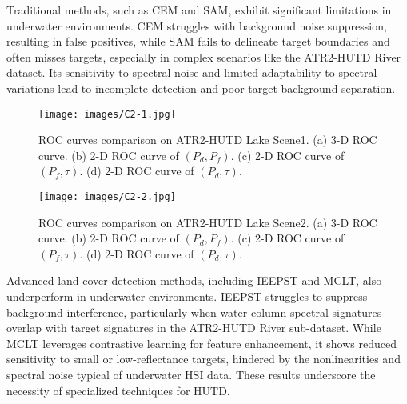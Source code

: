 Traditional methods, such as CEM and SAM, exhibit significant limitations in underwater environments. CEM struggles with background noise suppression, resulting in false positives, while SAM fails to delineate target boundaries and often misses targets, especially in complex scenarios like the ATR2-HUTD River dataset. Its sensitivity to spectral noise and limited adaptability to spectral variations lead to incomplete detection and poor target-background separation.
\par
\begin{figure*}[!t]                 
    \centering                    
    \texttt{[image: images/C2-1.jpg]}                     
    \caption{ROC curves comparison on ATR2-HUTD Lake Scene1. (a) 3-D ROC curve. (b) 2-D ROC curve of $(P_d, P_f)$. (c) 2-D ROC curve of $(P_f, \tau)$. (d) 2-D ROC curve of $(P_d, \tau)$.}                 
    \label{fig:C2-1}    
\end{figure*}
\begin{figure*}[!t]                 
    \centering                    
    \texttt{[image: images/C2-2.jpg]}                     
    \caption{ROC curves comparison on ATR2-HUTD Lake Scene2. (a) 3-D ROC curve. (b) 2-D ROC curve of $(P_d, P_f)$. (c) 2-D ROC curve of $(P_f, \tau)$. (d) 2-D ROC curve of $(P_d, \tau)$.}                                  
    \label{fig:C2-2}    
\end{figure*}
Advanced land-cover detection methods, including IEEPST and MCLT, also underperform in underwater environments. IEEPST struggles to suppress background interference, particularly when water column spectral signatures overlap with target signatures in the ATR2-HUTD River sub-dataset. While MCLT leverages contrastive learning for feature enhancement, it shows reduced sensitivity to small or low-reflectance targets, hindered by the nonlinearities and spectral noise typical of underwater HSI data. These results underscore the necessity of specialized techniques for HUTD.


